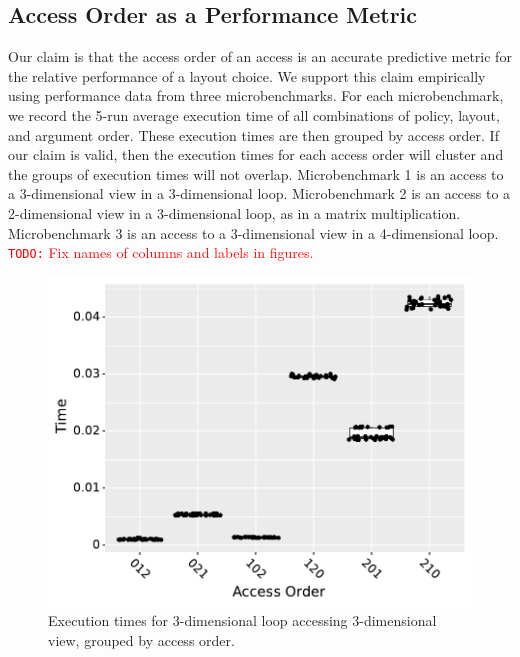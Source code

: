 \documentclass[sigconf, table]{acmart}
\newcommand{\todo}[1]{{\textcolor{red}{{\tt{TODO:}}\,\,#1 }}}
\begin{document}
\subsection{Access Order as a Performance Metric}
Our claim is that the access order of an access is an accurate predictive metric for the relative performance of a layout choice. 
We support this claim empirically using performance data from three microbenchmarks.
For each microbenchmark, we record the 5-run average execution time of all combinations of policy, layout, and argument order. 
These execution times are then grouped by access order.
If our claim is valid, then the execution times for each access order will cluster and the groups of execution times will not overlap.
Microbenchmark 1 is an access to a 3-dimensional view in a 3-dimensional loop. 
Microbenchmark 2 is an access to a 2-dimensional view in a 3-dimensional loop, as in a matrix multiplication.
Microbenchmark 3 is an access to a 3-dimensional view in a 4-dimensional loop.
\todo{Fix names of columns and labels in figures.}
\begin{figure}
	\includegraphics[width=\columnwidth]{benchmark1_boxplot.pdf}
	\caption{Execution times for 3-dimensional loop accessing 3-dimensional view, grouped by access order.}
	\label{AccessBenchmark1}
\end{figure}
\end{document}
